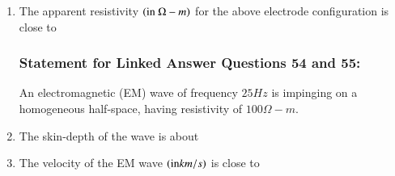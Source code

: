 \documentclass[journal,12pt,onecolumn]{IEEEtran}
\theoremstyle{remark}
\begin{document}
\begin{enumerate}[start = 26 ]
        \item The apparent resistivity $\left(\text{in }\Omega-m\right)$ for the above electrode configuration is close to \hfill{}
            \begin{enumerate}
            \end{enumerate}

\subsubsection*{Statement for Linked Answer Questions 54 and 55:}
An electromagnetic (EM) wave of frequency $25 Hz$ is impinging on a homogeneous half-space, having resistivity of $100 \Omega-m$.

        \item The skin-depth of the wave is about \hfill{}
            \begin{enumerate}
            \end{enumerate}
        
        \item The velocity of the EM wave $\left(\text{in} km/s\right)$ is close to \hfill{}
            \begin{enumerate}
            \end{enumerate}
            

\end{enumerate}
\end{document}
